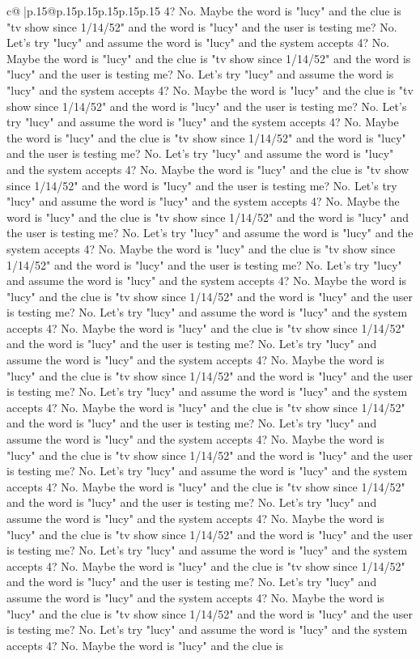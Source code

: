\documentclass{article}
\begin{document}
{\begin{supertabular}{c@{$\;$}|p{.15\linewidth}@{}p{.15\linewidth}p{.15\linewidth}p{.15\linewidth}p{.15\linewidth}p{.15\linewidth}}
{{{4? No. Maybe the word is "lucy" and the clue is "tv show since 1/14/52" and the word is "lucy" and the user is testing me? No. Let's try "lucy" and assume the word is "lucy" and the system accepts 4? No. Maybe the word is "lucy" and the clue is "tv show since 1/14/52" and the word is "lucy" and the user is testing me? No. Let's try "lucy" and assume the word is "lucy" and the system accepts 4? No. Maybe the word is "lucy" and the clue is "tv show since 1/14/52" and the word is "lucy" and the user is testing me? No. Let's try "lucy" and assume the word is "lucy" and the system accepts 4? No. Maybe the word is "lucy" and the clue is "tv show since 1/14/52" and the word is "lucy" and the user is testing me? No. Let's try "lucy" and assume the word is "lucy" and the system accepts 4? No. Maybe the word is "lucy" and the clue is "tv show since 1/14/52" and the word is "lucy" and the user is testing me? No. Let's try "lucy" and assume the word is "lucy" and the system accepts 4? No. Maybe the word is "lucy" and the clue is "tv show since 1/14/52" and the word is "lucy" and the user is testing me? No. Let's try "lucy" and assume the word is "lucy" and the system accepts 4? No. Maybe the word is "lucy" and the clue is "tv show since 1/14/52" and the word is "lucy" and the user is testing me? No. Let's try "lucy" and assume the word is "lucy" and the system accepts 4? No. Maybe the word is "lucy" and the clue is "tv show since 1/14/52" and the word is "lucy" and the user is testing me? No. Let's try "lucy" and assume the word is "lucy" and the system accepts 4? No. Maybe the word is "lucy" and the clue is "tv show since 1/14/52" and the word is "lucy" and the user is testing me? No. Let's try "lucy" and assume the word is "lucy" and the system accepts 4? No. Maybe the word is "lucy" and the clue is "tv show since 1/14/52" and the word is "lucy" and the user is testing me? No. Let's try "lucy" and assume the word is "lucy" and the system accepts 4? No. Maybe the word is "lucy" and the clue is "tv show since 1/14/52" and the word is "lucy" and the user is testing me? No. Let's try "lucy" and assume the word is "lucy" and the system accepts 4? No. Maybe the word is "lucy" and the clue is "tv show since 1/14/52" and the word is "lucy" and the user is testing me? No. Let's try "lucy" and assume the word is "lucy" and the system accepts 4? No. Maybe the word is "lucy" and the clue is "tv show since 1/14/52" and the word is "lucy" and the user is testing me? No. Let's try "lucy" and assume the word is "lucy" and the system accepts 4? No. Maybe the word is "lucy" and the clue is "tv show since 1/14/52" and the word is "lucy" and the user is testing me? No. Let's try "lucy" and assume the word is "lucy" and the system accepts 4? No. Maybe the word is "lucy" and the clue is "tv show since 1/14/52" and the word is "lucy" and the user is testing me? No. Let's try "lucy" and assume the word is "lucy" and the system accepts 4? No. Maybe the word is "lucy" and the clue is "tv show since 1/14/52" and the word is "lucy" and the user is testing me? No. Let's try "lucy" and assume the word is "lucy" and the system accepts 4? No. Maybe the word is "lucy" and the clue is }}}
\end{supertabular}}
\end{document}
